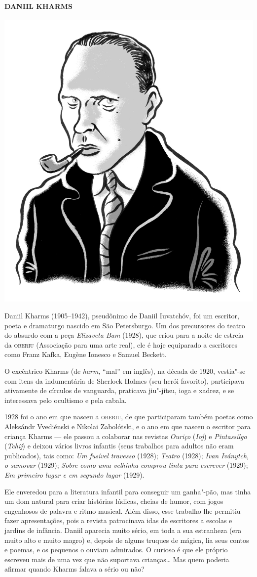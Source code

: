 {\paragraph{DANIIL KHARMS}

\noindent\includegraphics[width=.8in]{./imgs/autor12.jpg}

\noindent{}Daniil Kharms (1905--1942), pseudônimo de Daniil Iuvatchóv, foi um
escritor, poeta e dramaturgo nascido em São Petersburgo. Um dos
precursores do teatro do absurdo com a peça \emph{Elizaveta Bam} (1928),
que criou para a noite de estreia da \textsc{oberiu} (Associação para uma arte
real), ele é hoje equiparado a escritores como Franz Kafka, Eugène
Ionesco e Samuel Beckett.

O excêntrico Kharms (de \emph{harm}, ``mal'' em inglês), na década de
1920, vestia"-se com itens da indumentária de Sherlock Holmes (seu herói
favorito), participava ativamente de círculos de vanguarda, praticava
jiu"-jítsu, ioga e xadrez, e se interessava pelo ocultismo e pela cabala.

1928 foi o ano em que nasceu a \textsc{oberiu}, de que participaram também poetas
como Aleksándr Vvediénski e Nikolai Zabolótski, e o ano em que nasceu o
escritor para criança Kharms --- ele passou a colaborar nas revistas
\emph{Ouriço} (\emph{Ioj}) e \emph{Pintassilgo} (\emph{Tchij}) e deixou
vários livros infantis (seus trabalhos para adultos não eram
publicados), tais como: \emph{Um fusível travesso} (1928); \emph{Teatro}
(1928); \emph{Ivan Iványtch, o samovar} (1929); \emph{Sobre como uma
velhinha comprou tinta para escrever} (1929); \emph{Em primeiro lugar e
em segundo lugar} (1929).

Ele enveredou para a literatura infantil para conseguir um ganha"-pão,
mas tinha um dom natural para criar histórias lúdicas, cheias de humor,
com jogos engenhosos de palavra e ritmo musical. Além disso, esse
trabalho lhe permitiu fazer apresentações, pois a revista patrocinava
idas de escritores a escolas e jardins de infância. Daniil aparecia
muito sério, em toda a sua estranheza (era muito alto e muito magro) e,
depois de alguns truques de mágica, lia seus contos e poemas, e os
pequenos o ouviam admirados. O curioso é que ele próprio escreveu mais
de uma vez que não suportava crianças\ldots{} Mas quem poderia afirmar quando
Kharms falava a sério ou não?

}
